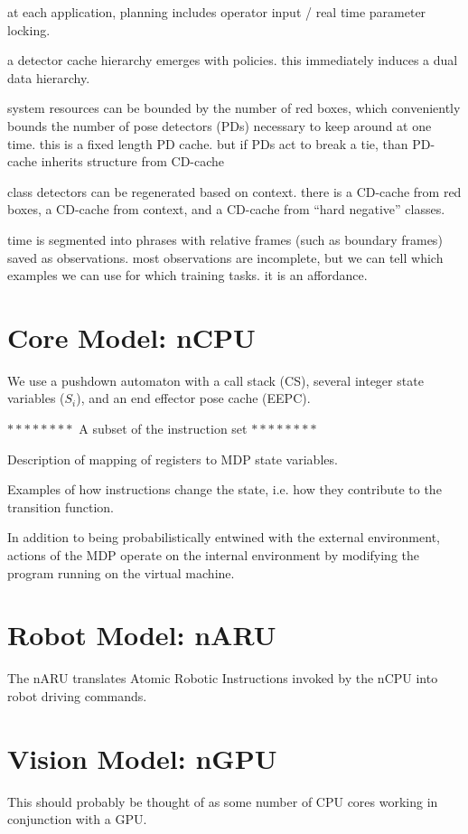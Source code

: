 \documentclass[conference]{IEEEtran}
\begin{document}
at each application, planning includes operator input / real time parameter locking.

a detector cache hierarchy emerges with policies. this immediately induces a dual data hierarchy.

system resources can be bounded by the number of red boxes, which conveniently bounds 
the number of pose detectors (PDs) necessary to keep around at one time. this is a 
fixed length PD cache. but if PDs act to break a tie, than PD-cache inherits structure from CD-cache

class detectors can be regenerated based on context. there is a CD-cache from red 
boxes, a CD-cache from context, and a CD-cache from “hard negative” classes.

time is segmented into phrases with relative frames (such as boundary frames) saved 
as observations. most observations are incomplete, but we can tell which examples we 
can use for which training tasks.  it is an affordance.


\section{Core Model: nCPU}
We use a pushdown automaton with a call stack (CS), several 
integer state variables ($S_i$), and an end effector pose cache (EEPC).

$********$ A subset of the instruction set $********$

Description of mapping of registers to MDP state variables.

Examples of how instructions change the state, i.e. how they
contribute to the transition function.

In addition to being probabilistically entwined with the external environment, 
actions of the MDP operate on the internal environment by modifying the program
running on the virtual machine. 


\section{Robot Model: nARU}
The nARU translates Atomic Robotic Instructions invoked by the nCPU 
into robot driving commands.


\section{Vision Model: nGPU}
This should probably be thought of as some number of CPU cores working
in conjunction with a GPU.
\end{document}
